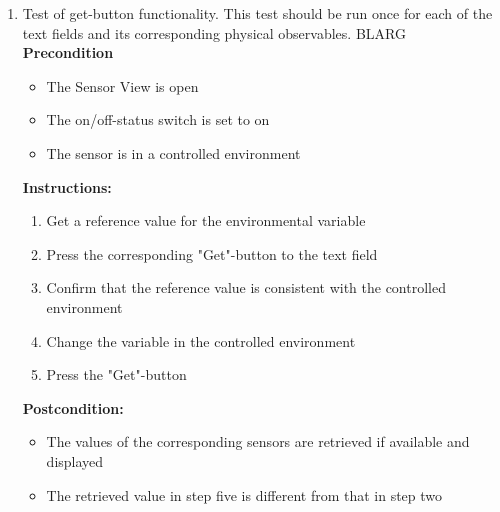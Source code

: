\documentclass[a4paper]{article}
\newlength{\testlabellength}
\newenvironment{testlist}{\begin{enumerate}[label=\bfseries Instruction \thesubsection.\arabic* , labelindent=0pt, labelwidth=\testlabellength , leftmargin=2cm]}{\end{enumerate}}
\newenvironment{precondition}{
{\color{white}BLARG}\\ 
\textbf{Precondition}
\begin{itemize}[labelindent=0cm, labelwidth=2cm , leftmargin=1cm]
}
{\end{itemize}}
\newenvironment{instruction}{
\textbf{Instructions:}
\begin{enumerate}[label=\bfseries  \arabic*., labelindent=0cm, labelwidth=2cm , leftmargin=1cm]
}
{\end{enumerate}}
\newenvironment{postcondition}{
\textbf{Postcondition:}
\begin{itemize}[labelindent=0cm, labelwidth=2cm , leftmargin=1cm]
}
{\end{itemize}}
\begin{document}
\begin{appendices}
\begin{testlist}
	\item Test of get-button functionality.
		\newline This test should be run once for each of the text fields and its corresponding physical observables.
		\begin{precondition}
			\item The Sensor View is open
			\item The on/off-status switch is set to on
			\item The sensor is in a controlled environment
		\end{precondition}
		\begin{instruction}
			\item Get a reference value for the environmental variable
			\item Press the corresponding "Get"-button to the text field
			\item Confirm that the reference value is consistent with the controlled environment
			\item Change the variable in the controlled environment
			\item Press the "Get"-button
		\end{instruction}
		\begin{postcondition}
			\item The values of the corresponding sensors are retrieved if available and displayed
			\item The retrieved value in step five is different from that in step two
		\end{postcondition}


\end{testlist}
\end{appendices}
\end{document}
